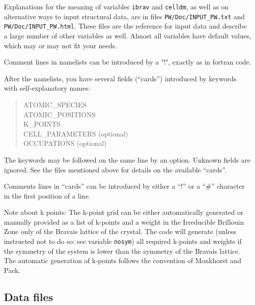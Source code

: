 \documentclass[12pt,a4paper]{article}
\begin{document}
Explanations for the meaning of variables \texttt{ibrav} and \texttt{celldm},
as well as on alternative ways to input structural data,
are in files \texttt{PW/Doc/INPUT\_PW.txt} and \texttt{PW/Doc/INPUT\_PW.html}. 
These files are the reference for input data and describe a large number
of other variables as well. Almost all variables have default 
values, which may or may not fit your needs.

Comment lines in namelists can be introduced by a "!", exactly as in fortran 
code.
    
After the namelists, you have several fields (``cards'')
introduced by keywords with self-explanatory names:
\begin{quote}
       ATOMIC\_SPECIES\\
       ATOMIC\_POSITIONS\\
       K\_POINTS\\
       CELL\_PARAMETERS (optional)\\
       OCCUPATIONS (optional)\\
\end{quote}
The keywords may be followed on the same line by an option. Unknown
fields are ignored. 
See the files mentioned above for details on the available ``cards''.

Comments lines in ``cards'' can be introduced by either a ``!'' or a ``\#''
character in the first position of a line.
 
Note about k points: The k-point grid can be either automatically generated 
or manually provided as a list of k-points and a weight in the Irreducible
Brillouin Zone only of the Bravais lattice of the crystal. The code will 
generate (unless instructed not to do so: see variable \texttt{nosym}) all
required k-points
and weights if the symmetry of the system is lower than the symmetry of the
Bravais lattice. The automatic generation of k-points follows the convention
of Monkhorst and Pack.

\subsection{Data files}
\end{document}
